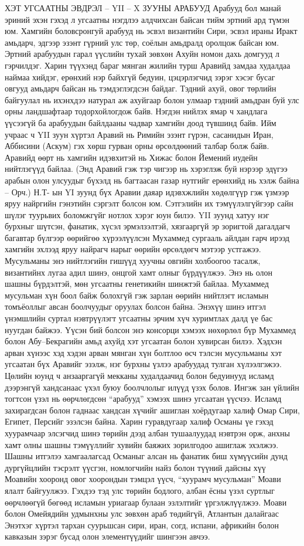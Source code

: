 ХЭТ УГСААТНЫ ЭВДРЭЛ – YII – X ЗУУНЫ АРАБУУД
Арабууд бол манай эриний эхэн гэхэд л угсаатны нэгдлээ алдчихсан байсан тийм эртний ард түмэн юм. Хамгийн боловсронгуй арабууд нь эсвэл византийн Сири, эсвэл ираны Иракт амьдарч, эдгээр эзэнт гүрний улс төр, соёлын амьдралд оролцож байсан юм.
Эртний арабуудын гарал үүслийн тухай зөвхөн Ахуйн номон дахь домгууд л гэрчилдэг. Харин түүхэнд бараг мянган жилийн турш Аравийд замдаа худалдаа наймаа хийдэг, ерөнхий нэр байхгүй бедуин, цэцэрлэгчид зэрэг хэсэг бусаг овгууд амьдарч байсан нь тэмдэглэгдсэн байдаг. Тэдний ахуй, овог төрлийн байгуулал нь ихэнхдээ натурал аж ахуйгаар болон улмаар тэдний амьдран буй улс орны ландшафтаар тодорхойлогдож байв. Нэгдэн нийлэх ямар ч хандлага үүсээгүй ба арабуудын байлдааны чадвар хамгийн доод түвшинд байв. Ийм учраас ч YII зуун хүртэл Аравий нь Римийн эзэнт гүрэн, сасанидын Иран, Аббисини (Аскум) гэх хөрш гурван орны өрсөлдөөний талбар болж байв. Аравийд өөрт нь хамгийн идэвхитэй нь Хижас болон Йемений иудейн нийтлэгүүд байлаа.
(Энд Аравий гэж тэр чигээр нь хэрэглэж буй нэрээр эдүгээ арабын олон улсуудыг бүхэлд нь багтаасан газар нутгийг ерөнхийд нь хэлж байна – Орч.)
Н.Т- ын YI зуунд бүх Аравии даяар идэвхжлийн хөдөлгүүр гэж үзмээр яруу найргийн гэнэтийн сэргэлт болсон юм. Сэтгэлийн их тэмүүлэлгүйгээр сайн шүлэг туурьвих боломжгүйг нотлох хэрэг юун билээ. YII зуунд хатуу нэг бурхныг шүтсэн, фанатик, хүсэл эрмэлзэлтэй, хязгааргүй эр зоригтой дагалдагч багавтар бүлгээр өөрийгөө хүрээлүүлсэн Мухаммед сургааль айлдан гарч ирээд хамгийн эхлээд яруу найрагч нарыг өөрийн өрсөлдөгч мэтээр устгажээ. Мусульманы энэ нийтлэгийн гишүүд хуучны овгийн холбоогоо тасалж, византийнх лугаа адил шинэ, онцгой хамт олныг бүрдүүлжээ. Энэ нь олон шашны бүрдэлтэй, мөн угсаатны генетикийн шинжтэй байлаа. Мухаммед мусульман хүн боол байж болохгүй гэж зарлан өөрийн нийтлэгт исламын томъёоллыг авсан боолчуудыг оруулах болсон байна. Энэхүү шинэ итгэл үнэмшлийн суртал нэвтрүүлэгт угсаатны эрчим хүч хуримтлах далд үе бас нуугдан байжээ.
Үүсэн бий болсон энэ консорци хэмээх нөхөрлөл бүр Мухаммед болон Абу–Бекрагийн амьд ахуйд хэт угсаатан болон хувирсан билээ. Хэдхэн арван хүнээс хэд хэдэн арван мянган хүн болтлоо өсч тэлсэн мусульманы хэт угсаатан бүх Аравийг эзэлж, нэг бурхны үзлээ арабуудад тулган хүлээлгэжээ. Цөлийн юунд ч анзааргагүй мекканы худалдаачид болон бедуинууд исламд дээрэнгүй хандсанаас үхэл буюу боолчлолыг илүүд үзэх болов. Ингэж зан үйлийн тогтсон үзэл нь өөрчлөгдсөн “арабууд” хэмээх шинэ угсаатан үүсчээ.
Исламд захирагдсан болон гаднаас хандсан хүчийг ашиглан хоёрдугаар халиф Омар Сири, Египет, Персийг эзэлсэн байна. Харин гуравдугаар халиф Османы үе гэхэд хуурамчаар элсэгчид шинэ төрийн дээд албан тушаалуудад нэвтрэн орж, анхны хамт олны шашны тэмүүллийг хувийн баяжих зорилгодоо ашиглаж эхэлжээ. Шашны итгэлээ хамгаалагсад Османыг алсан нь фанатик биш хүмүүсийн дунд дургүйцлийн тэсрэлт үүсгэн, номлогчийн найз болон түүний дайсны хүү Моавийн хооронд овог хоорондын тэмцэл үүсч, “хуурамч мусульман” Моави ялалт байгуулжээ. Гэхдээ тэд улс төрийн бодлого, албан ёсны үзэл суртлыг өөрчлөөгүй бөгөөд исламын уриагаар булаан эзлэлтийг үргэлжлүүлжээ. Моави болон Омейядийн удмынхны улс зөвхөн араб төдийгүй, Атлантын далайгаас Энэтхэг хүртэл тархан суурьшсан сири, иран, согд, испани, африкийн болон кавказын зэрэг бусад олон элементүүдийг шингээн авчээ.
